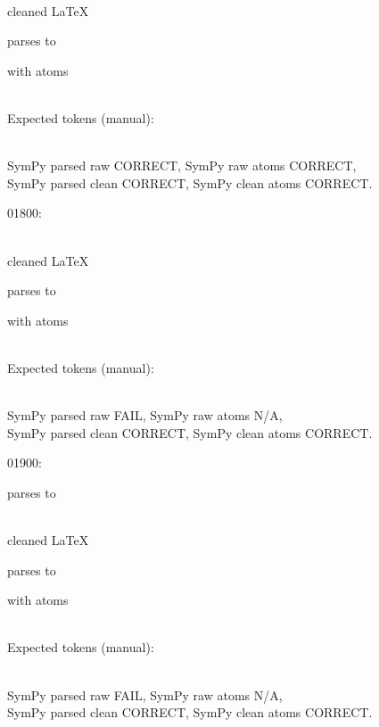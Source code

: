 \documentclass{article}
\begin{document}
\ \\
cleaned \LaTeX

parses to

with atoms



\ \\
Expected tokens (manual): 



\ \\
SymPy parsed raw CORRECT, 
SymPy raw atoms CORRECT, \\
SymPy parsed clean CORRECT, 
SymPy clean atoms CORRECT.

\hrulefill

01800:



\ \\
cleaned \LaTeX

parses to

with atoms



\ \\
Expected tokens (manual): 



\ \\
SymPy parsed raw FAIL, 
SymPy raw atoms N/A, \\
SymPy parsed clean CORRECT, 
SymPy clean atoms CORRECT.

\hrulefill

01900:

parses to


\ \\
cleaned \LaTeX

parses to

with atoms



\ \\
Expected tokens (manual): 



\ \\
SymPy parsed raw FAIL, 
SymPy raw atoms N/A, \\
SymPy parsed clean CORRECT, 
SymPy clean atoms CORRECT.
\end{document}
